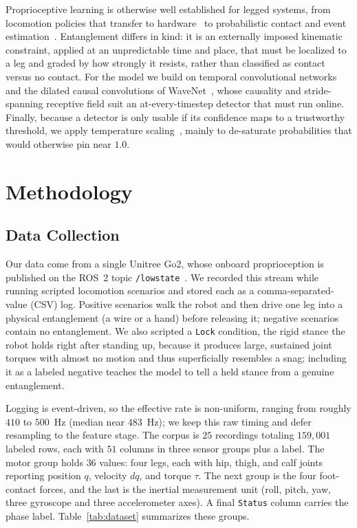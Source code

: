 \documentclass[conference]{IEEEtran}
\begin{document}
Proprioceptive learning is otherwise well established for legged systems, from locomotion policies that transfer to hardware~\cite{hwangbo2019learning,lee2020learning} to probabilistic contact and event estimation~\cite{camurri2017contact,bledt2018contact}. Entanglement differs in kind: it is an externally imposed kinematic constraint, applied at an unpredictable time and place, that must be localized to a leg and graded by how strongly it resists, rather than classified as contact versus no contact. For the model we build on temporal convolutional networks~\cite{bai2018tcn} and the dilated causal convolutions of WaveNet~\cite{oord2016wavenet}, whose causality and stride-spanning receptive field suit an at-every-timestep detector that must run online. Finally, because a detector is only usable if its confidence maps to a trustworthy threshold, we apply temperature scaling~\cite{guo2017calibration,niculescu2005predicting}, mainly to de-saturate probabilities that would otherwise pin near $1.0$.

\section{Methodology}
\label{sec:method}
\subsection{Data Collection}

Our data come from a single Unitree Go2, whose onboard proprioception is published on the ROS~2 topic \texttt{/lowstate}~\cite{macenski2022ros2,unitree_go2}. We recorded this stream while running scripted locomotion scenarios and stored each as a comma-separated-value (CSV) log. Positive scenarios walk the robot and then drive one leg into a physical entanglement (a wire or a hand) before releasing it; negative scenarios contain no entanglement. We also scripted a \texttt{Lock} condition, the rigid stance the robot holds right after standing up, because it produces large, sustained joint torques with almost no motion and thus superficially resembles a snag; including it as a labeled negative teaches the model to tell a held stance from a genuine entanglement.

Logging is event-driven, so the effective rate is non-uniform, ranging from roughly $410$ to $500$~Hz (median near $483$~Hz); we keep this raw timing and defer resampling to the feature stage. The corpus is $25$ recordings totaling $159{,}001$ labeled rows, each with $51$ columns in three sensor groups plus a label. The motor group holds $36$ values: four legs, each with hip, thigh, and calf joints reporting position $q$, velocity $dq$, and torque $\tau$. The next group is the four foot-contact forces, and the last is the inertial measurement unit (roll, pitch, yaw, three gyroscope and three accelerometer axes). A final \texttt{Status} column carries the phase label. Table~\ref{tab:dataset} summarizes these groups.
\end{document}
